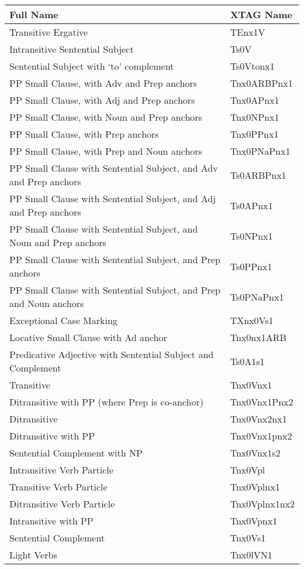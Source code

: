 \footnotesize 
\begin{tabular}{ll} 
Full Name&XTAG Name\\ 
\hline 
Transitive Ergative  &  TEnx1V\\ 
Intransitive Sentential Subject &  Ts0V\\ 
Sentential Subject with `to' complement &  Ts0Vtonx1\\ 
PP Small Clause, with Adv and Prep anchors & Tnx0ARBPnx1\\ 
PP Small Clause, with Adj and Prep anchors & Tnx0APnx1\\ 
PP Small Clause, with Noun and Prep anchors & Tnx0NPnx1\\ 
PP Small Clause, with Prep anchors & Tnx0PPnx1\\ 
PP Small Clause, with Prep and Noun anchors & Tnx0PNaPnx1\\ 
PP Small Clause with Sentential Subject, and Adv and Prep anchors & Ts0ARBPnx1\\ 
PP Small Clause with Sentential Subject, and Adj and Prep anchors & Ts0APnx1\\ 
PP Small Clause with Sentential Subject, and Noun and Prep anchors & Ts0NPnx1\\ 
PP Small Clause with Sentential Subject, and Prep anchors & Ts0PPnx1\\ 
PP Small Clause with Sentential Subject, and Prep and Noun anchors & Ts0PNaPnx1\\ 
Exceptional Case Marking & TXnx0Vs1\\ 
Locative Small Clause with Ad anchor & Tnx0nx1ARB\\ 
Predicative Adjective with Sentential Subject and Complement & Ts0A1s1\\ 
Transitive & Tnx0Vnx1\\ 
Ditransitive with PP (where Prep is co-anchor) & Tnx0Vnx1Pnx2\\ 
Ditransitive & Tnx0Vnx2nx1\\ 
Ditransitive with PP & Tnx0Vnx1pnx2\\ 
Sentential Complement with NP & Tnx0Vnx1s2\\ 
Intransitive Verb Particle & Tnx0Vpl\\ 
Transitive Verb Particle & Tnx0Vplnx1\\ 
Ditransitive Verb Particle & Tnx0Vplnx1nx2\\ 
Intransitive with PP & Tnx0Vpnx1\\ 
Sentential Complement & Tnx0Vs1\\ 
Light Verbs & Tnx0lVN1\\ 

\end{tabular}
